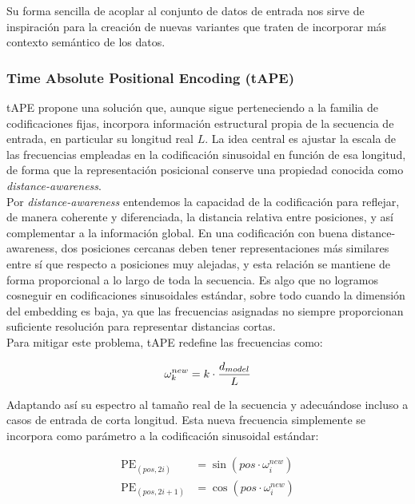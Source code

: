Su forma sencilla de acoplar al conjunto de datos de entrada nos sirve de inspiración para la creación de nuevas variantes que traten de incorporar más contexto semántico de los datos.

\subsubsection{Time Absolute Positional Encoding (tAPE)}

tAPE propone una solución que, aunque sigue perteneciendo a la familia de codificaciones fijas, incorpora información estructural propia de la secuencia de entrada, en particular su longitud real $L$. La idea central es ajustar la escala de las frecuencias empleadas en la codificación sinusoidal en función de esa longitud, de forma que la representación posicional conserve una propiedad conocida como \textit{distance-awareness}.\\

Por \textit{distance-awareness} entendemos la capacidad de la codificación para reflejar, de manera coherente y diferenciada, la distancia relativa entre posiciones, y así complementar a la información global. En una codificación con buena distance-awareness, dos posiciones cercanas deben tener representaciones más similares entre sí que respecto a posiciones muy alejadas, y esta relación se mantiene de forma proporcional a lo largo de toda la secuencia. Es algo que no logramos cosneguir en codificaciones sinusoidales estándar, sobre todo cuando la dimensión del embedding es baja, ya que las frecuencias asignadas no siempre proporcionan suficiente resolución para representar distancias cortas.\\

Para mitigar este problema, tAPE redefine las frecuencias como:

\begin{equation}
	\centering
	\omega^{new}_k = k \cdot \frac{d_{model}}{L}
\end{equation}

Adaptando así su espectro al tamaño real de la secuencia y adecuándose incluso a casos de entrada de corta longitud. Esta nueva frecuencia simplemente se incorpora como parámetro a la codificación sinusoidal estándar:

\begin{equation}
	\begin{aligned}
		\text{PE}_{(pos,2i)} &= \sin\!\left( pos \cdot \omega^{new}_i \right) \\
		\text{PE}_{(pos,2i+1)} &= \cos\!\left( pos \cdot \omega^{new}_i \right)
	\end{aligned}
\end{equation}



